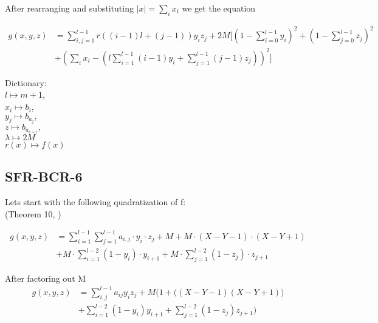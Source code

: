 \documentclass[a4paper,english,notitlepage,longbibliography,showpacs,preprintnumbers,amsmath,amssymb,aps,prx,nofootinbib,12pt,superscriptaddress]{revtex4-1}
\begin{document}
After rearranging and substituting $|x| = \sum_ix_i$ we get the equation

\begin{equation}
  \begin{split}
  \left.
  g(x,y,z)
  \right.
  &= \sum_{i,j=1}^{l-1}r((i-1)l+(j-1))y_iz_j
  + 2M\Bigg[\left(1-\sum_{i=0}^{l-1}y_i\right)^2 + \left(1-\sum_{j=0}^{l-1}z_j\right)^2\\
  &+ \left(\sum_ix_i - \left(l\sum_{i=1}^{l-1}(i-1)y_i + \sum_{j=1}^{l-1}(j-1)z_j\right)\right)^2\Bigg]
  \end{split}
\end{equation}

Dictionary: \\
$l\mapsto m + 1$,\\
$x_i\mapsto b_i$, \\
$y_j\mapsto b_{a_j},$\\
$z\mapsto b_{a_{c+i}},$\\
$\lambda\mapsto 2M$\\
$r(x)\mapsto f(x)$


\subsection{SFR-BCR-6}

Lets start with the following quadratization of f:
\\(Theorem 10, \cite{Boros2018QuadratizationsOS})

\begin{equation}
  \begin{split}
  \left.
  g(x,y,z)
  \right.
  &= \sum_{i=1}^{l-1}\sum_{j=1}^{l-1}a_{i,j}\cdot y_i\cdot z_j + M
  + M\cdot(X-Y-1)\cdot(X-Y+1)\\
  &+ M\cdot\sum_{i=1}^{l-2}(1-y_i)\cdot y_{i+1} + M\cdot\sum_{j=1}^{l-2}(1-z_j)\cdot z_{j+1}
  \end{split}
\end{equation}

After factoring out M
\begin{equation}
  \begin{split}
  \left.
  g(x,y,z)
  \right.
  &= \sum_{i,j}^{l-1}a_{ij}y_iz_j + M\Big(1 + \Big((X-Y-1)(X-Y+1)\Big)\\
  &+ \sum_{i=1}^{l-2}(1-y_i)y_{i+1} + \sum_{j=1}^{l-2}(1-z_j)z_{j+1}\Big)
  \end{split}
\end{equation}
\end{document}
